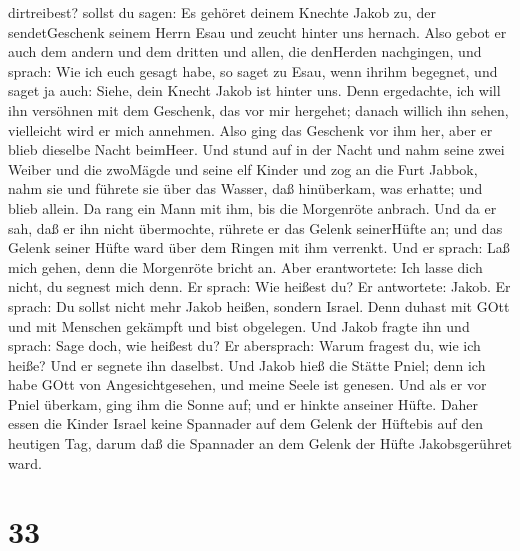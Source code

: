 dirtreibest?  sollst du sagen: Es gehöret deinem Knechte
Jakob zu, der sendetGeschenk seinem Herrn Esau und zeucht hinter uns
hernach.  Also gebot er auch dem andern und dem dritten und
allen, die denHerden nachgingen, und sprach: Wie ich euch gesagt habe,
so saget zu Esau, wenn ihrihm begegnet,  und saget ja auch:
Siehe, dein Knecht Jakob ist hinter uns. Denn ergedachte, ich will ihn
versöhnen mit dem Geschenk, das vor mir hergehet; danach willich ihn
sehen, vielleicht wird er mich annehmen.  Also ging das
Geschenk vor ihm her, aber er blieb dieselbe Nacht beimHeer.
 Und stund auf in der Nacht und nahm seine zwei Weiber und
die zwoMägde und seine elf Kinder und zog an die Furt Jabbok,
 nahm sie und führete sie über das Wasser, daß hinüberkam,
was erhatte;  und blieb allein. Da rang ein Mann mit ihm,
bis die Morgenröte anbrach.  Und da er sah, daß er ihn
nicht übermochte, rührete er das Gelenk seinerHüfte an; und das Gelenk
seiner Hüfte ward über dem Ringen mit ihm verrenkt.  Und er
sprach: Laß mich gehen, denn die Morgenröte bricht an. Aber
erantwortete: Ich lasse dich nicht, du segnest mich denn. 
Er sprach: Wie heißest du? Er antwortete: Jakob.  Er
sprach: Du sollst nicht mehr Jakob heißen, sondern Israel. Denn duhast
mit GOtt und mit Menschen gekämpft und bist obgelegen.  Und
Jakob fragte ihn und sprach: Sage doch, wie heißest du? Er abersprach:
Warum fragest du, wie ich heiße? Und er segnete ihn daselbst.
 Und Jakob hieß die Stätte Pniel; denn ich habe GOtt von
Angesichtgesehen, und meine Seele ist genesen.  Und als er
vor Pniel überkam, ging ihm die Sonne auf; und er hinkte anseiner Hüfte.
 Daher essen die Kinder Israel keine Spannader auf dem
Gelenk der Hüftebis auf den heutigen Tag, darum daß die Spannader an dem
Gelenk der Hüfte Jakobsgerühret ward.

\hypertarget{section-32}{%
\section{33}\label{section-32}}

